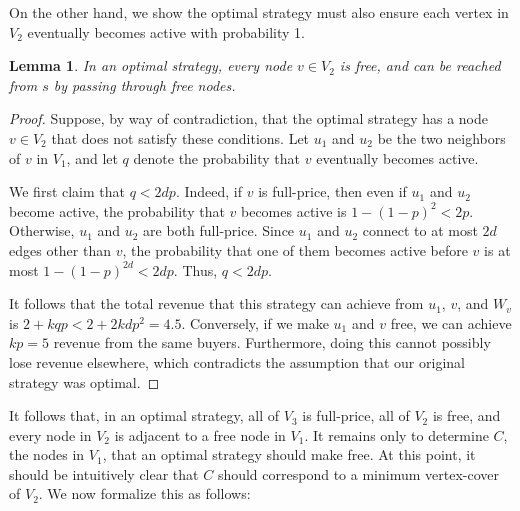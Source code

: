 \documentclass[letterpaper,twoside]{article}
\newtheorem{lemma}{Lemma}
\begin{document}
On the other hand, we show the optimal strategy must also ensure each
vertex in $V_2$ eventually becomes active with probability 1.
\begin{lemma} \label{lem:v2}
  In an optimal strategy, every node $v \in V_2$ is free, and can be
  reached from $s$ by passing through free nodes.
\end{lemma}
\begin{proof}
Suppose, by way of contradiction, that the optimal strategy has a node
$v \in V_2$ that does not satisfy these conditions. Let $u_1$ and
$u_2$ be the two neighbors of $v$ in $V_1$, and let $q$ denote the
probability that $v$ eventually becomes active.

We first claim that $q < 2dp$. Indeed, if $v$ is full-price, then
even if $u_1$ and $u_2$ become active, the probability that $v$
becomes active is $1 - (1-p)^2 < 2p$. Otherwise, $u_1$ and $u_2$ are
both full-price. Since $u_1$ and $u_2$ connect to at most $2d$ edges
other than $v$, the probability that one of them becomes active
before $v$ is at most $1 - (1-p)^{2d} < 2dp$. Thus, $q < 2dp$.

It follows that the total revenue that this strategy can achieve from
$u_1$, $v$, and $W_v$ is $2 + kqp < 2 + 2kdp^2 = 4.5$. Conversely,
if we make $u_1$ and $v$ free, we can achieve $kp = 5$ revenue from
the same buyers. Furthermore, doing this cannot possibly lose
revenue elsewhere, which contradicts the assumption that our
original strategy was optimal.
\end{proof}

It follows that, in an optimal strategy, all of $V_3$ is full-price,
all of $V_2$ is free, and every node in $V_2$ is adjacent to a free
node in $V_1$. It remains only to determine $C$, the nodes in $V_1$,
that an optimal strategy should make free. At this point, it should be
intuitively clear that $C$ should correspond to a minimum
vertex-cover of $V_2$. We now formalize this as follows:
\end{document}
